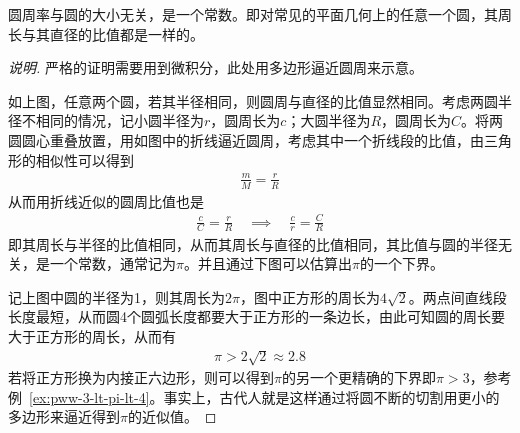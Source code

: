 \begin{example}[$\pi$是个常数]
  圆周率与圆的大小无关，是一个常数。即对常见的平面几何上的任意一个圆，其周长与其直径的比值都是一样的。
\end{example}
\begin{proof}[说明]
  严格的证明需要用到微积分，此处用多边形逼近圆周来示意。
  \begin{center}
  \end{center}
  如上图，任意两个圆，若其半径相同，则圆周与直径的比值显然相同。考虑两圆半径不相同的情况，记小圆半径为$r$，圆周长为$c$；大圆半径为$R$，圆周长为$C$。将两圆圆心重叠放置，用如图中的折线逼近圆周，考虑其中一个折线段的比值，由三角形的相似性可以得到
  \begin{align*}
    \frac{m}{M} = \frac{r}{R}
  \end{align*}
  从而用折线近似的圆周比值也是
  \begin{align*}
    \frac{c}{C}=\frac{r}{R} \quad \implies \quad  \frac{c}{r} = \frac{C}{R}
  \end{align*}
  即其周长与半径的比值相同，从而其周长与直径的比值相同，其比值与圆的半径无关，是一个常数，通常记为$\pi$。并且通过下图可以估算出$\pi$的一个下界。
  \begin{center}
  \end{center}
  记上图中圆的半径为1，则其周长为$2\pi$，图中正方形的周长为$4\sqrt2$。两点间直线段长度最短，从而圆4个圆弧长度都要大于正方形的一条边长，由此可知圆的周长要大于正方形的周长，从而有
  \begin{align*}
    \pi>2\sqrt2\approx 2.8
  \end{align*}
  若将正方形换为内接正六边形，则可以得到$\pi$的另一个更精确的下界即$\pi>3$，参考例~\ref{ex:pww-3-lt-pi-lt-4}。事实上，古代人就是这样通过将圆不断的切割用更小的多边形来逼近得到$\pi$的近似值。
\end{proof}


